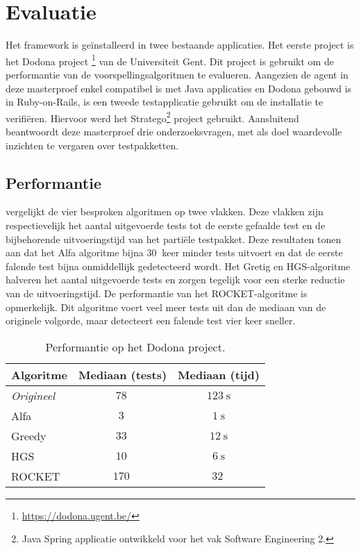\section{Evaluatie}
\noindent Het framework is ge\"installeerd in twee bestaande applicaties. Het eerste project is het Dodona project 
\footnote{\url{https://dodona.ugent.be/}} van de Universiteit Gent. Dit project is gebruikt om de performantie van de voorspellingsalgoritmen te evalueren. Aangezien de agent in deze masterproef enkel compatibel is met Java applicaties en Dodona gebouwd is in Ruby-on-Rails, is een tweede testapplicatie gebruikt om de installatie te verifi\"eren. Hiervoor werd het Stratego\footnote{Java Spring applicatie ontwikkeld voor het vak Software Engineering 2.} project gebruikt. Aansluitend beantwoordt deze masterproef drie onderzoeksvragen, met als doel waardevolle inzichten te vergaren over testpakketten.

\subsection{Performantie}
\noindent {} vergelijkt de vier besproken algoritmen op twee vlakken. Deze vlakken zijn respectievelijk het aantal uitgevoerde tests tot de eerste gefaalde test en de bijbehorende uitvoeringstijd van het parti\"ele testpakket. Deze resultaten tonen aan dat het Alfa algoritme bijna $\SI{30}{}$ keer minder tests uitvoert en dat de eerste falende test bijna onmiddellijk gedetecteerd wordt. Het Gretig en HGS-algoritme halveren het aantal uitgevoerde tests en zorgen tegelijk voor een sterke reductie van de uitvoeringstijd. De performantie van het ROCKET-algoritme is opmerkelijk. Dit algoritme voert veel meer tests uit dan de mediaan van de originele volgorde, maar detecteert een falende test vier keer sneller.

\begin{table}[h]
	\centering
	\begin{tabularx}{\columnwidth}{|X||c|c|}
		\hline
		\textbf{Algoritme} & \textbf{Mediaan (tests)} & \textbf{Mediaan (tijd)}\\
		\hline
		\emph{Origineel} & $\SI{78}{}$ & $\SI{123}{\second}$\\
		
		\hline
		
		Alfa & $\SI{3}{}$ & $\SI{1}{\second}$\\
		
		Greedy & $\SI{33}{}$ & $\SI{12}{\second}$\\
		
		HGS & $\SI{10}{}$ & $\SI{6}{\second}$\\
		
		ROCKET & $\SI{170}{}$ & $\SI{32}{}$\\
		
		\hline
	\end{tabularx}
	\caption{Performantie op het Dodona project.}
	\label{tbl:performance-dodona}
\end{table}

